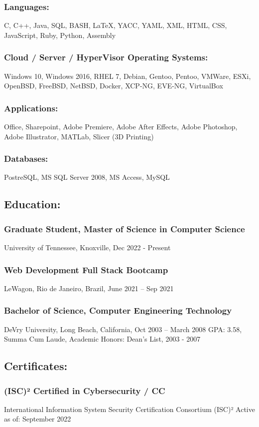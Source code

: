 \documentclass[letter,10pt]{article}
\begin{document}
\subsubsection*{Languages:}
\label{sec:orgd424b1a}
C, C++, Java, SQL, BASH, \LaTeX{}, YACC, YAML, XML, HTML, CSS, JavaScript, Ruby, Python, Assembly
\subsubsection*{Cloud / Server / HyperVisor Operating Systems:}
\label{sec:orgbf4ff79}
Windows 10, Windows 2016, RHEL 7, Debian, Gentoo, Pentoo, VMWare, ESXi, OpenBSD, FreeBSD, NetBSD, Docker, XCP-NG, EVE-NG, VirtualBox
\subsubsection*{Applications:}
\label{sec:org3a96f57}
Office, Sharepoint, Adobe Premiere, Adobe After Effects, Adobe Photoshop, Adobe Illustrator, MATLab, Slicer (3D Printing)
\subsubsection*{Databases:}
\label{sec:org268daf3}
PostreSQL, MS SQL Server 2008, MS Access, MySQL
\subsection*{Education:}
\label{sec:org28fe0cc}
\subsubsection*{Graduate Student, Master of Science in Computer Science}
\label{sec:orgbc8ab07}
University of Tennessee, Knoxville, Dec 2022 - Present
\subsubsection*{Web Development Full Stack Bootcamp}
\label{sec:org9c909fd}
LeWagon, Rio de Janeiro, Brazil, June 2021 – Sep 2021
\subsubsection*{Bachelor of Science, Computer Engineering Technology}
\label{sec:org1e60a43}
DeVry University, Long Beach, California, Oct 2003 – March 2008
GPA: 3.58, Summa Cum Laude, Academic Honors: Dean’s List, 2003 - 2007

\subsection*{Certificates:}
\label{sec:org1d1a076}
\subsubsection*{(ISC)² Certified in Cybersecurity / CC}
\label{sec:org4dc500b}
International Information System Security Certification Consortium (ISC)²
Active as of: September 2022
\end{document}
